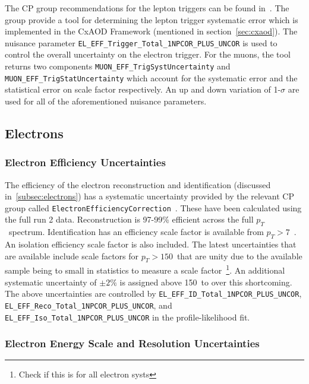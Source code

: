 The CP group recommendations for the lepton triggers can be found
in~\cite{VHObjectNote2019}. The group provide a tool for determining the lepton
trigger systematic error which is implemented in the CxAOD Framework (mentioned
in section~\ref{sec:cxaod}). The nuisance parameter
\texttt{EL\_EFF\_Trigger\_Total\_1NPCOR\_PLUS\_UNCOR} is used to control the overall
uncertainty on the electron trigger. For the muons, the tool returns two components
\texttt{MUON\_EFF\_TrigSystUncertainty} and \texttt{MUON\_EFF\_TrigStatUncertainty}
which account for the systematic error and the statistical error on scale factor
respectively. An up and down variation of 1-$\sigma$ are used for all of the
aforementioned nuisance parameters.

\subsection{Electrons}

\subsubsection{Electron Efficiency Uncertainties}

The efficiency of the electron reconstruction and identification (discussed
in~\ref{subsec:electrons}) has a systematic uncertainty provided by the relevant
CP group called \texttt{ElectronEfficiencyCorrection}~\cite{electronTWiki}.
These have been calculated using the full run 2 data. Reconstruction is 97-99\%
efficient across the full $p_T$~spectrum. Identification has an efficiency scale
factor is available from $p_T>7$~\GeV. An isolation efficiency scale factor is
also included. The latest uncertainties that are available include scale factors
for $p_T>150$~\GeV that are unity due to the available sample being to small in
statistics to measure a scale factor~\footnote{Check if this is for all electron
  systs}. An additional systematic uncertainty of $\pm 2\%$ is assigned above
150~\GeV to over this shortcoming. The above uncertainties are controlled by
\texttt{EL\_EFF\_ID\_Total\_1NPCOR\_PLUS\_UNCOR},
\texttt{EL\_EFF\_Reco\_Total\_1NPCOR\_PLUS\_UNCOR}, and
\texttt{EL\_EFF\_Iso\_Total\_1NPCOR\_PLUS\_UNCOR} in the profile-likelihood fit.

\subsubsection{Electron Energy Scale and Resolution Uncertainties}

